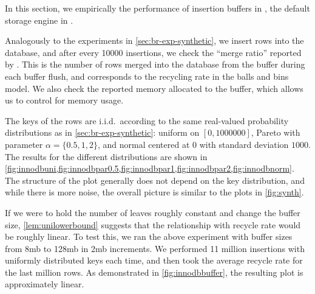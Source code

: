 In this section, we empirically the performance of insertion buffers in
\innodb{}, the default storage engine in \mysql{}.

Analogously to the experiments in \cref{sec:br-exp-synthetic}, we insert rows into
the \mysql{} database, and after every 10000 insertions, we check the ``merge
ratio'' reported by \innodb{}.  This is the number of rows merged into the
database from the buffer during each buffer flush, and corresponds to the
recycling rate in the balls and bins model. We also check the reported memory
allocated to the buffer, which allows us to control for memory usage. 



The keys of the rows are i.i.d.\ according to the same real-valued probability
distributions as in \cref{sec:br-exp-synthetic}: uniform on $[0,1000000]$, Pareto
with parameter $\alpha = \{0.5,1,2\}$, and normal centered at 0 with standard
deviation $1000$. The results for the different distributions are shown in
\cref{fig:innodbuni,fig:innodbpar0.5,fig:innodbpar1,fig:innodbpar2,fig:innodbnorm}.
The structure of the plot generally does not depend on the key distribution,
and while there is more noise, the overall picture is similar to the plots in
\cref{fig:synth}. 

If we were to hold the number of leaves roughly constant and change the buffer
size, \cref{lem:unilowerbound} suggests that the relationship with recycle rate
would be roughly linear. To test this, we ran the above experiment with buffer
sizes from 8mb to 128mb in 2mb increments. We performed 11 million insertions
with uniformly distributed keys each time, and then took the average recycle
rate for the last million rows. As demonstrated in \cref{fig:innodbbuffer}, the
resulting plot is approximately linear.

